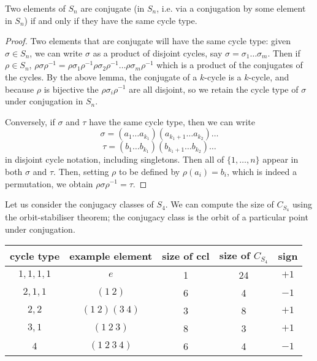 \begin{proposition}
	Two elements of \(S_n\) are conjugate (in \(S_n\), i.e. via a conjugation by some element in \(S_n\)) if and only if they have the same cycle type.
\end{proposition}
\begin{proof}
	Two elements that are conjugate will have the same cycle type: given \(\sigma \in S_n\), we can write \(\sigma\) as a product of disjoint cycles, say \(\sigma = \sigma_1\dots\sigma_m\). Then if \(\rho \in S_n\), \(\rho \sigma \rho^{-1} = \rho \sigma_1 \rho^{-1} \rho \sigma_2 \rho^{-1} \dots \rho \sigma_m \rho^{-1}\) which is a product of the conjugates of the cycles. By the above lemma, the conjugate of a \(k\)-cycle is a \(k\)-cycle, and because \(\rho\) is bijective the \(\rho \sigma_i \rho^{-1}\) are all disjoint, so we retain the cycle type of \(\sigma\) under conjugation in \(S_n\).

	Conversely, if \(\sigma\) and \(\tau\) have the same cycle type, then we can write
	\[ \sigma = (a_1\dots a_{k_1})(a_{k_1+1}\dots a_{k_2})\dots \]
	\[ \tau = (b_1\dots b_{k_1})(b_{k_1+1}\dots b_{k_2})\dots \]
	in disjoint cycle notation, including singletons. Then all of \(\{ 1, \dots, n \}\) appear in both \(\sigma\) and \(\tau\). Then, setting \(\rho\) to be defined by \(\rho(a_i) = b_i\), which is indeed a permutation, we obtain \(\rho\sigma\rho^{-1}=\tau\).
\end{proof}
Let us consider the conjugacy classes of \(S_4\). We can compute the size of \(C_{S_4}\) using the orbit-stabiliser theorem; the conjugacy class is the orbit of a particular point under conjugation.\medskip

\noindent\begin{tabular}{c|c|c|c|c}
	cycle type & example element & size of ccl & size of \(C_{S_4}\) & sign \\ \hline
	\(1,1,1,1\)  & \(e\)             & 1           & 24                & \(+1\) \\
	\(2,1,1\)    & \((1\ 2)\)        & 6           & 4                 & \(-1\) \\
	\(2,2\)      & \((1\ 2)(3\ 4)\)  & 3           & 8                 & \(+1\) \\
	\(3,1\)      & \((1\ 2\ 3)\)     & 8           & 3                 & \(+1\) \\
	\(4\)        & \((1\ 2\ 3\ 4)\)  & 6           & 4                 & \(-1\) \\
\end{tabular}

